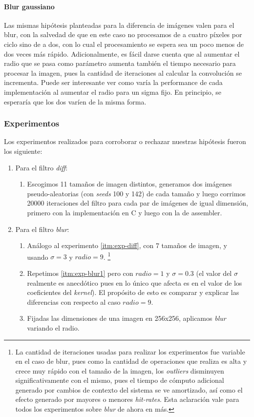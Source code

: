 \paragraph*{Blur gaussiano}
Las mismas hipótesis planteadas para la diferencia de imágenes valen para el blur, con la salvedad de que en este caso no procesamos de a cuatro píxeles por ciclo sino de a dos, con lo cual el procesamiento se espera sea un poco menos de dos veces más rápido. Adicionalmente, es fácil darse cuenta que al aumentar el radio que se pasa como parámetro aumenta también el tiempo necesario para procesar la imagen, pues la cantidad de iteraciones al calcular la convolución se incrementa. Puede ser interesante ver como varía la performance de cada implementación al aumentar el radio para un sigma fijo. En principio, se esperaría que los dos varíen de la misma forma.

\subsubsection*{Experimentos}
Los experimentos realizados para corroborar o rechazar nuestras hipótesis fueron los siguiente:
\begin{enumerate}
	\item Para el filtro \emph{diff}: 
		\begin{enumerate}
			\item \label{itm:exp-diff} Escogimos 11 tamaños de imagen distintos, generamos dos imágenes pseudo-aleatorias (con \emph{seeds} 100 y 142) de cada tamaño y luego corrimos 20000 iteraciones del filtro para cada par de imágenes de igual dimensión, primero con la implementación en C y luego con la de assembler.
		\end{enumerate}
	\item Para el filtro \emph{blur}:
		\begin{enumerate}
			\item \label{itm:exp-blur1}Análogo al experimento \ref{itm:exp-diff}, con 7 tamaños de imagen, y usando $\sigma=3$ y $radio=9$. \footnote{La cantidad de iteraciones usadas para realizar los experimentos fue variable en el caso de blur, pues como la cantidad de operaciones que realiza es alta y crece muy rápido con el tamaño de la imagen, los \emph{outliers} disminuyen significativamente con el mismo, pues el tiempo de cómputo adicional generado por cambios de contexto del sistema se ve amortizado, así como el efecto generado por mayores o menores \emph{hit-rates}. Esta aclaración vale para todos los experimentos sobre \emph{blur} de ahora en más.}
			\item Repetimos \ref{itm:exp-blur1} pero con $radio = 1$ y $\sigma = 0.3$ (el valor del $\sigma$ realmente es anecdótico pues en lo único que afecta es en el valor de los coeficientes del \emph{kernel}). El propósito de esto es comparar y explicar las diferencias con respecto al caso $radio = 9$.
			\item Fijadas las dimensiones de una imagen en 256x256, aplicamos \emph{blur} variando el radio.
		\end{enumerate}
\end{enumerate}

